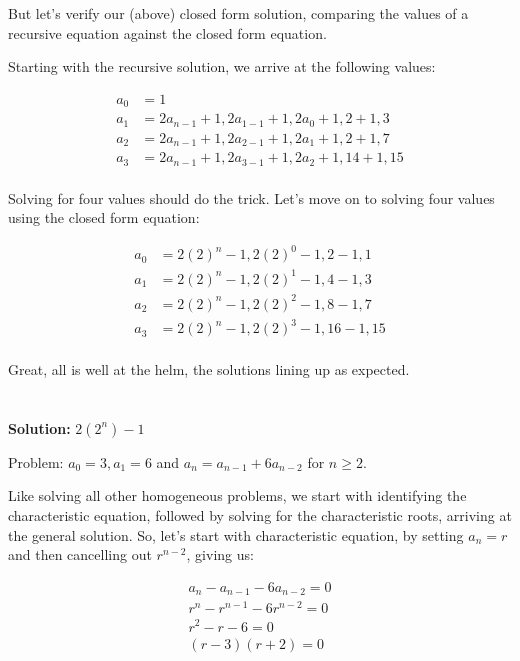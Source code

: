 \documentclass{article}
\begin{document}
But let's verify our (above) closed form solution, comparing the values of a recursive equation against the closed form equation.

Starting with the recursive solution, we arrive at the following values:

\begin{align*}
    a_0 &= 1 \\
    a_1 &= 2a_{n-1} + 1, 2a_{1-1} + 1, 2a_{0} + 1, 2 + 1, 3 \\
    a_2 &= 2a_{n-1} + 1, 2a_{2-1} + 1, 2a_{1} + 1, 2 + 1, 7 \\
    a_3 &= 2a_{n-1} + 1, 2a_{3-1} + 1, 2a_{2} + 1, 14 + 1, 15 \\
\end{align*}

Solving for four values should do the trick. Let's move on to solving four values using the closed form equation:

\begin{align*}
    a_0 &= 2(2)^n - 1, 2(2)^0 - 1, 2 - 1, 1 \\
    a_1 &= 2(2)^n - 1, 2(2)^1 - 1, 4 - 1, 3 \\
    a_2 &= 2(2)^n - 1, 2(2)^2 - 1, 8 - 1, 7 \\
    a_3 &= 2(2)^n - 1, 2(2)^3 - 1, 16 - 1, 15 \\
\end{align*}

Great, all is well at the helm, the solutions lining up as expected.

\section{}

\textbf{Solution:} $2(2^n) - 1$

Problem: $a_0=3, a_1=6$ and $a_n = a_{n-1} + 6a_{n-2}$ for $n \ge 2$.

Like solving all other homogeneous problems, we start with identifying the characteristic equation, followed by solving for the characteristic roots, arriving at the general solution. So, let's start with characteristic equation, by setting $a_n = r$ and then cancelling out $r^{n-2}$, giving us:

\begin{align*}
    a_n - a_{n-1} - 6a_{n-2} = 0 \\
    r^n - r^{n-1} - 6r^{n-2} = 0 \\
    r^2 - r - 6 = 0 \\
    (r-3)(r+2) = 0 \\
\end{align*}
\end{document}
